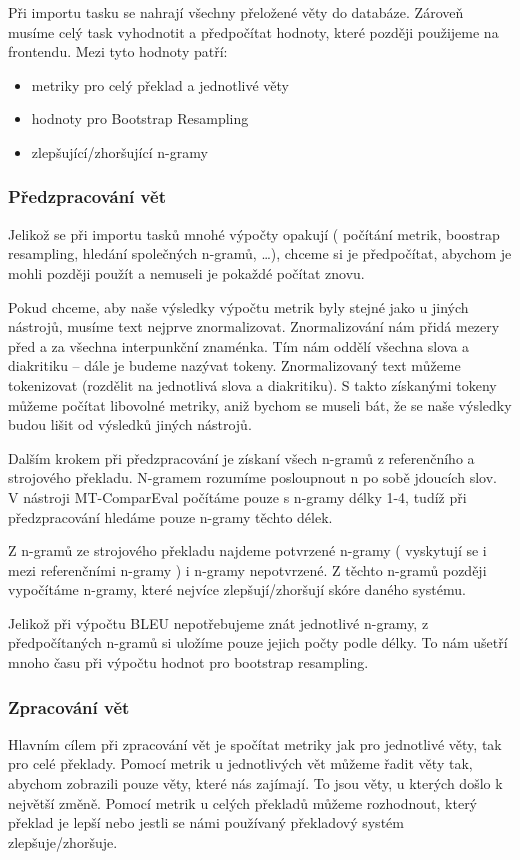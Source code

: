 Při importu tasku se nahrají všechny přeložené věty do databáze.
Zároveň musíme celý task vyhodnotit a předpočítat hodnoty,
  které později použijeme na frontendu.
Mezi tyto hodnoty patří:
\begin{itemize}
	\item metriky pro celý překlad a jednotlivé věty
	\item hodnoty pro Bootstrap Resampling 
	\item zlepšující/zhoršující n-gramy
\end{itemize}

\subsubsection{Předzpracování vět}
Jelikož se při importu tasků mnohé výpočty opakují
  ( počítání metrik, boostrap resampling, hledání společných n-gramů, \dots ),
  chceme si je předpočítat,
  abychom je mohli později použít a nemuseli je pokaždé počítat znovu.

Pokud chceme,
  aby naše výsledky výpočtu metrik byly stejné jako u jiných nástrojů,
  musíme text nejprve znormalizovat.
Znormalizování nám přidá mezery před a za všechna interpunkční znaménka.
Tím nám oddělí všechna slova a diakritiku -- dále je budeme nazývat tokeny.
Znormalizovaný text můžeme tokenizovat (rozdělit na jednotlivá slova a diakritiku).
S takto získanými tokeny můžeme počítat libovolné metriky,
  aniž bychom se museli bát,
  že se naše výsledky budou lišit od výsledků jiných nástrojů.

Dalším krokem při předzpracování je získaní všech n-gramů z referenčního a strojového překladu.
N-gramem rozumíme posloupnout n po sobě jdoucích slov.
V nástroji MT-ComparEval počítáme pouze s n-gramy délky 1-4,
  tudíž při předzpracování hledáme pouze n-gramy těchto délek. 

Z n-gramů ze strojového překladu najdeme potvrzené n-gramy
  ( vyskytují se i mezi referenčními n-gramy )
  i n-gramy nepotvrzené.
Z těchto n-gramů později vypočítáme n-gramy,
  které nejvíce zlepšují/zhoršují skóre daného systému.
  
Jelikož při výpočtu BLEU nepotřebujeme znát jednotlivé n-gramy,
  z předpočítaných n-gramů si uložíme pouze jejich počty podle délky.
To nám ušetří mnoho času při výpočtu hodnot pro bootstrap resampling.

\subsubsection{Zpracování vět}
Hlavním cílem při zpracování vět je spočítat metriky jak pro jednotlivé věty,
  tak pro celé překlady.
Pomocí metrik u jednotlivých vět můžeme řadit věty tak,
  abychom zobrazili pouze věty, 
  které nás zajímají.
To jsou věty, u kterých došlo k největší změně.
Pomocí metrik u celých překladů můžeme rozhodnout,
  který překlad je lepší
  nebo jestli se námi používaný překladový systém zlepšuje/zhoršuje.


